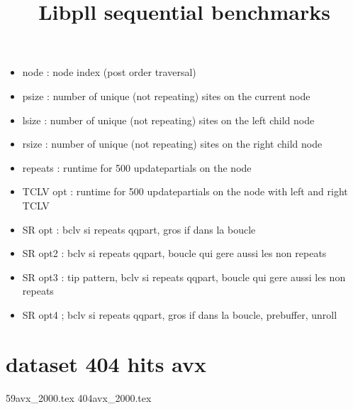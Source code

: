 \documentclass[a4paper]{article}
\begin{document}
\newcommand*{\figuretitle}[1]{%
    {\centering%
    \textbf{#1}%
    \par\medskip}%
}


\title{Libpll sequential benchmarks}
\maketitle


\begin{itemize}
\item node : node index (post order traversal)
\item psize : number of unique (not repeating) sites on the current node
\item lsize : number of unique (not repeating) sites on the left child node
\item rsize : number of unique (not repeating) sites on the right child node
\item repeats : runtime for 500 updatepartials on the node
\item TCLV opt : runtime for 500 updatepartials on the node with left and right TCLV
\end{itemize}



\begin{itemize}
\item SR opt : bclv si repeats qqpart, gros if dans la boucle
\item SR opt2 :  bclv si repeats qqpart, boucle qui gere aussi les non repeats
\item SR opt3 : tip pattern, bclv si repeats qqpart, boucle qui gere aussi les non repeats
\item SR opt4 ; bclv si repeats qqpart, gros if dans la boucle, prebuffer, unroll
\end{itemize}


\section{dataset 404 hits avx}
%
{59avx_2000.tex}
{404avx_2000.tex}
\end{document}
